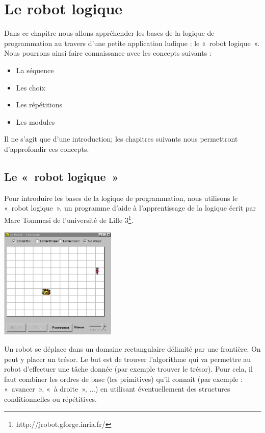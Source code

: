 \chapter{Le robot logique}

	Dans ce chapitre nous allons appréhender les bases de la logique de
	programmation au travers d'une petite application
	ludique : le «~robot logique~». Nous pourrons ainsi faire connaissance
	avec les concepts suivants :
	
	\begin{itemize}
	\item La séquence
	\item Les choix
	\item Les répétitions
	\item Les modules
	\end{itemize}

	Il ne s'agit que d'une introduction;
	les chapitres suivants nous permettront d'approfondir
	ces concepts.

\section{Le «~robot logique~»}

	Pour introduire les bases de la logique de programmation, nous utilisons
	le «~robot logique~», un programme d'aide à
	l'apprentissage de la logique écrit par Marc Tommasi
	de l'université de Lille
	3\footnote{http://jrobot.gforge.inria.fr/}.
	
	\begin{center}
	\includegraphics[width=5.553cm,height=5.302cm]{image/robot-grille}
	\end{center}
	
	Un robot se déplace dans un domaine rectangulaire délimité par une
	frontière. On peut y placer un trésor. Le but est de trouver
	l'algorithme qui va permettre au robot
	d'effectuer une tâche donnée (par exemple trouver le
	trésor). Pour cela, il faut combiner les ordres de base (les
	primitives) qu'il connait (par exemple : «~avancer~»,
	«~à droite~», ...) en utilisant éventuellement des structures
	conditionnelles ou répétitives.

